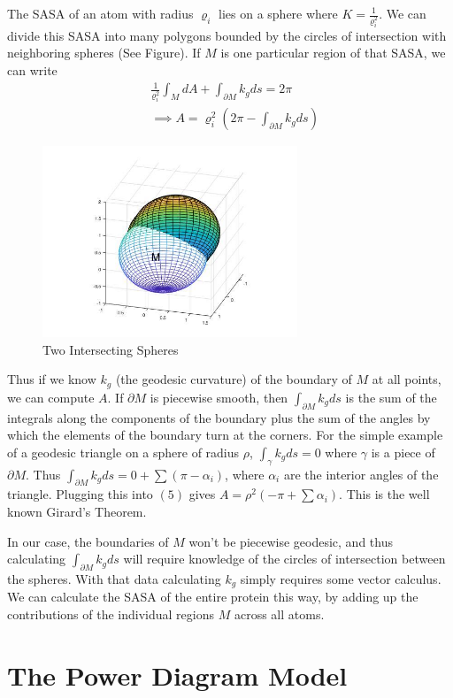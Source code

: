 \documentclass{article}
\begin{document}
The SASA of an atom with radius $\varrho_i$ lies on a sphere where $K=\frac{1}{\varrho_i^2}$. We can divide this SASA into many polygons bounded by the circles of intersection with neighboring spheres (See Figure). If $M$ is one particular region of that SASA, we can write 
\begin{align}\nonumber
&\frac{1}{\varrho_i^2}\int_M dA + \int_{\partial M} k_g ds= 2\pi \\
&\implies A=\varrho_i^2\left(2\pi-\int_{\partial M} k_g ds\right)
\end{align}

\begin{figure}[h!]
\caption{Two Intersecting Spheres}
\centerline{\includegraphics[width=3in]{spheres}}
\end{figure}
Thus if we know $k_g$ (the geodesic curvature) of the boundary of $M$ at all points, we can compute $A$. If $\partial M$ is piecewise smooth, then $\int_{\partial M} k_g ds$ is the sum of the integrals along the components of the boundary plus the sum of the angles by which the elements of the boundary turn at the corners. For the simple example of a geodesic triangle on a sphere of radius $\rho$, $\int_\gamma k_g ds=0$ where $\gamma$ is a piece of $\partial M$. Thus $\int_{\partial M} k_g ds=0+\sum (\pi-\alpha_i)$, where $\alpha_i$ are the interior angles of the triangle. Plugging this into $(5)$ gives $A=\rho^2(-\pi+\sum\alpha_i)$. This is the well known Girard's Theorem. 

In our case, the boundaries of $M$ won't be piecewise geodesic, and thus calculating $\int_{\partial M} k_g ds$ will require knowledge of the circles of intersection between the spheres. With that data calculating $k_g$ simply requires some vector calculus.
We can calculate the SASA of the entire protein this way, by adding up the contributions of the individual regions $M$ across all atoms.

\section{The Power Diagram Model}
\end{document}

